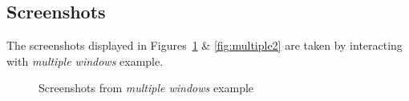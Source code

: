 \documentclass[11pt,a4paper,oneside]{article}
\begin{document}
   \subsection{Screenshots}
   The screenshots displayed in Figures~\ref{fig:multiple1} \& \ref{fig:multiple2} are taken by interacting with \emph{multiple windows} example.
   	\begin{figure}[!htbp]%
   	\centering
   	\qquad
   	\qquad
   	\caption{Screenshots from \emph{multiple windows} example}
   	\label{fig:multiple1}%
   \end{figure}
\end{document}
